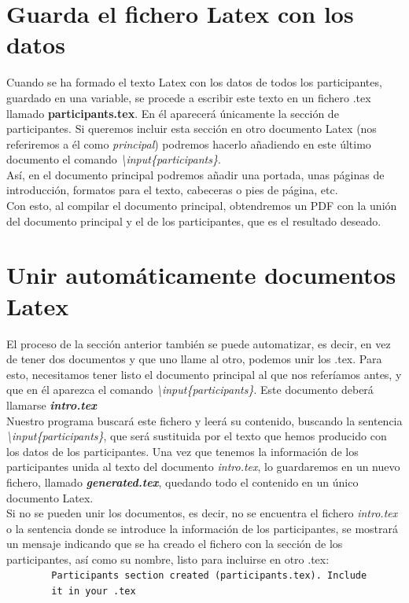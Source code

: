 \documentclass[a4paper, 12pt]{book}
\begin{document}
\section{Guarda el fichero Latex con los datos}
\label{sec:guardaLatex}
Cuando se ha formado el texto Latex con los datos de todos los participantes, guardado en una variable, se procede a escribir este texto en un fichero .tex llamado \textbf{participants.tex}. En él aparecerá únicamente la sección de participantes. Si queremos incluir esta sección en otro documento Latex (nos referiremos a él como \textit{principal}) podremos hacerlo añadiendo en este último documento el comando \mbox{\textit{\textbackslash input\{participants\}}}.\\

Así, en el documento principal podremos añadir una portada, unas páginas de introducción, formatos para el texto, cabeceras o pies de página, etc.\\

Con esto, al compilar el documento principal, obtendremos un PDF con la unión del documento principal y el de los participantes, que es el resultado deseado.


\section{Unir automáticamente documentos Latex}
\label{sec:uneLatex}
El proceso de la sección anterior también se puede automatizar, es decir, en vez de tener dos documentos y que uno llame al otro, podemos unir los .tex. Para esto, necesitamos tener listo el documento principal al que nos referíamos antes, y que en él aparezca el comando \mbox{\textit{\textbackslash input\{participants\}}}. Este documento deberá llamarse \textbf{\textit{intro.tex}}\\

Nuestro programa buscará este fichero y leerá su contenido, buscando la sentencia \mbox{\textit{\textbackslash input\{participants\}}}, que será sustituida por el texto que hemos producido con los datos de los participantes. Una vez que tenemos la información de los participantes unida al texto del documento \textit{intro.tex}, lo guardaremos en un nuevo fichero, llamado \textbf{\textit{generated.tex}}, quedando todo el contenido en un único documento Latex.\\

Si no se pueden unir los documentos, es decir, no se encuentra el fichero \textit{intro.tex} o la sentencia donde se introduce la información de los participantes, se mostrará un mensaje indicando que se ha creado el fichero con la sección de los participantes, así como su nombre, listo para incluirse en otro .tex:\\
\verb"        Participants section created (participants.tex). Include"\\
\verb"        it in your .tex"
\end{document}
